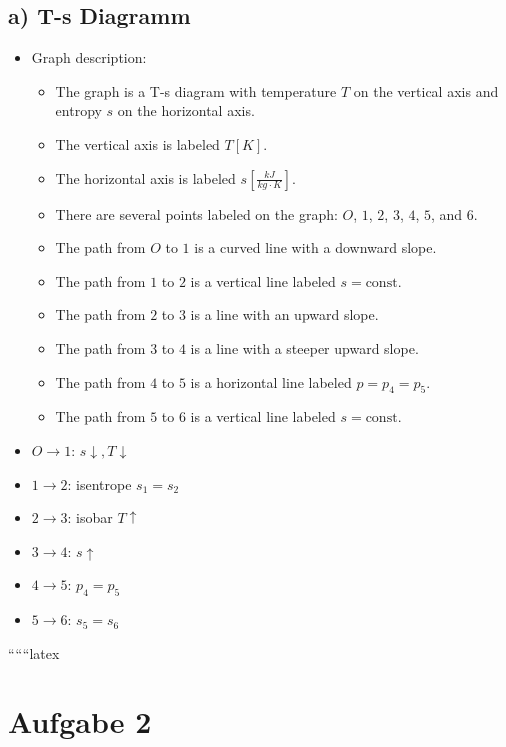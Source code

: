 \subsection*{a) T-s Diagramm}

\begin{itemize}
    \item Graph description:
    \begin{itemize}
        \item The graph is a T-s diagram with temperature \( T \) on the vertical axis and entropy \( s \) on the horizontal axis.
        \item The vertical axis is labeled \( T[K] \).
        \item The horizontal axis is labeled \( s \left[ \frac{kJ}{kg \cdot K} \right] \).
        \item There are several points labeled on the graph: \( O \), \( 1 \), \( 2 \), \( 3 \), \( 4 \), \( 5 \), and \( 6 \).
        \item The path from \( O \) to \( 1 \) is a curved line with a downward slope.
        \item The path from \( 1 \) to \( 2 \) is a vertical line labeled \( s = \text{const} \).
        \item The path from \( 2 \) to \( 3 \) is a line with an upward slope.
        \item The path from \( 3 \) to \( 4 \) is a line with a steeper upward slope.
        \item The path from \( 4 \) to \( 5 \) is a horizontal line labeled \( p = p_4 = p_5 \).
        \item The path from \( 5 \) to \( 6 \) is a vertical line labeled \( s = \text{const} \).
    \end{itemize}
\end{itemize}

\begin{itemize}
    \item \( O \rightarrow 1 \): \( s \downarrow, T \downarrow \)
    \item \( 1 \rightarrow 2 \): isentrope \( s_1 = s_2 \)
    \item \( 2 \rightarrow 3 \): isobar \( T \uparrow \)
    \item \( 3 \rightarrow 4 \): \( s \uparrow \)
    \item \( 4 \rightarrow 5 \): \( p_4 = p_5 \)
    \item \( 5 \rightarrow 6 \): \( s_5 = s_6 \)
\end{itemize}

``````latex


\section*{Aufgabe 2}